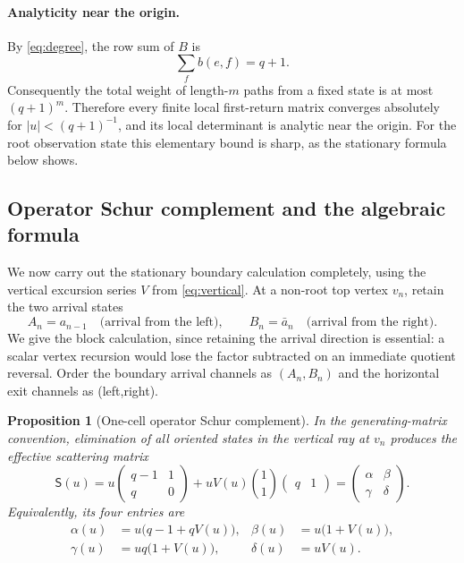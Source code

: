 \documentclass[11pt,reqno]{amsart}
\numberwithin{equation}{section}
\newtheorem{proposition}[theorem]{Proposition}
\theoremstyle{definition}
\theoremstyle{remark}
\begin{document}
\paragraph{Analyticity near the origin.}

By \eqref{eq:degree}, the row sum of $B$ is
\[
 \sum_f b(e,f)=q+1.
\]
Consequently the total weight of length-$m$ paths from a fixed state is at
most $(q+1)^m$.  Therefore every finite local first-return matrix converges
absolutely for $|u|<(q+1)^{-1}$, and its local determinant is analytic near the
origin.  For the root observation state this elementary bound is sharp, as the
stationary formula below shows.

\subsection{Operator Schur complement and the algebraic formula}
\label{subsec:stationary-schur}

We now carry out the stationary boundary calculation completely, using the
vertical excursion series $V$ from \eqref{eq:vertical}.
At a non-root top vertex $v_n$, retain the two arrival states
\[
 A_n=a_{n-1}\quad\text{(arrival from the left)},
 \qquad
 B_n=\bar a_n\quad\text{(arrival from the right)}.
\]
We give the block calculation, since retaining the arrival direction is
essential: a scalar vertex recursion would lose the factor subtracted on an
immediate quotient reversal.  Order the boundary arrival channels as
$(A_n,B_n)$ and the horizontal exit channels as (left,right).

\begin{proposition}[One-cell operator Schur complement]
\label{prop:onecell-schur}
In the generating-matrix convention, elimination of all oriented states in
the vertical ray at $v_n$ produces the effective scattering matrix
\begin{equation}\label{eq:sigma-schur}
 \mathsf S(u)=
 u\begin{pmatrix}q-1&1\\ q&0\end{pmatrix}
 +uV(u)\binom{1}{1}\begin{pmatrix}q&1\end{pmatrix}
 =\begin{pmatrix}\alpha&\beta\\ \gamma&\delta\end{pmatrix}.
\end{equation}
Equivalently, its four entries are
\begin{align}
 \alpha(u)&=u\bigl(q-1+qV(u)\bigr),
 &\beta(u)&=u\bigl(1+V(u)\bigr),\label{eq:scatter1}\\
 \gamma(u)&=uq\bigl(1+V(u)\bigr),
 &\delta(u)&=uV(u).\label{eq:scatter2}
\end{align}
\end{proposition}
\end{document}
